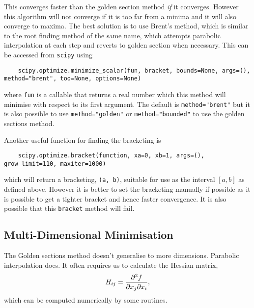 \documentclass[a4paper]{article}
\begin{document}
    This converges faster than the golden section method \emph{if} it converges.
    However this algorithm will not converge if it is too far from a minima and it will also converge to maxima.
    The best solution is to use Brent's method, which is similar to the root finding method of the same name, which attempts parabolic interpolation at each step and reverts to golden section when necessary.
    This can be accessed from \lstinline|scipy| using
    \begin{lstlisting}
    scipy.optimize.minimize_scalar(fun, bracket, bounds=None, args=(), method="brent", too=None, options=None)
    \end{lstlisting}
    where \lstinline|fun| is a callable that returns a real number which this method will minimise with respect to its first argument.
    The default is \lstinline|method="brent"| but it is also possible to use \lstinline|method="golden"| or \lstinline|method="bounded"| to use the golden sections method.
    
    Another useful function for finding the bracketing is
    \begin{lstlisting}
    scipy.optimize.bracket(function, xa=0, xb=1, args=(), grow_limit=110, maxiter=1000)
    \end{lstlisting}
    which will return a bracketing, \lstinline|(a, b)|, suitable for use as the interval \([a, b]\) as defined above.
    However it is better to set the bracketing manually if possible as it is possible to get a tighter bracket and hence faster convergence.
    It is also possible that this \lstinline|bracket| method will fail.
    
    \subsection{Multi-Dimensional Minimisation}
    The Golden sections method doesn't generalise to more dimensions.
    Parabolic interpolation does. 
    It often requires us to calculate the Hessian matrix,
    \[H_{ij} = \frac{\partial^2{f}}{\partial{x_j}\partial{x_i}},\]
    which can be computed numerically by some routines.
    
\end{document}
